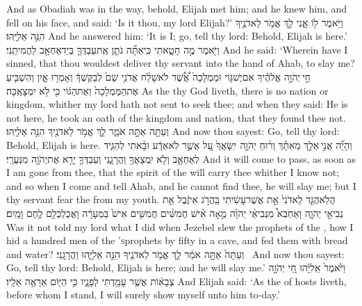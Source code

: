 {And as Obadiah was in the way, behold, Elijah met him; and he knew him, and fell on his face, and said: ‘Is it thou, my lord Elijah?’}
{וַיֹּ֥אמֶר ל֖וֹ אָ֑נִי לֵ֛ךְ אֱמֹ֥ר לַאדֹנֶ֖יךָ הִנֵּ֥ה אֵלִיָּֽהוּ׃}
{And he answered him: ‘It is I; go, tell thy lord: Behold, Elijah is here.’}
{וַיֹּ֖אמֶר מֶ֣ה חָטָ֑אתִי כִּֽי\maqqaf אַתָּ֞ה נֹתֵ֧ן אֶֽת\maqqaf עַבְדְּךָ֛ בְּיַד\maqqaf אַחְאָ֖ב לַהֲמִיתֵֽנִי׃}
{And he said: ‘Wherein have I sinned, that thou wouldest deliver thy servant into the hand of Ahab, to slay me?}
{חַ֣י \legarmeh  יְהֹוָ֣ה אֱלֹהֶ֗יךָ אִם\maqqaf יֶשׁ\maqqaf גּ֤וֹי וּמַמְלָכָה֙ אֲ֠שֶׁ֠ר לֹא\maqqaf שָׁלַ֨ח אֲדֹנִ֥י שָׁם֙ לְבַקֶּשְׁךָ֔ וְאָמְר֖וּ אָ֑יִן וְהִשְׁבִּ֤יעַ אֶת\maqqaf הַמַּמְלָכָה֙ וְאֶת\maqqaf הַגּ֔וֹי כִּ֖י לֹ֥א יִמְצָאֶֽכָּה׃}
{As the \lord\space thy God liveth, there is no nation or kingdom, whither my lord hath not sent to seek thee; and when they said: He is not here, he took an oath of the kingdom and nation, that they found thee not.}
{וְעַתָּ֖ה אַתָּ֣ה אֹמֵ֑ר לֵ֛ךְ אֱמֹ֥ר לַאדֹנֶ֖יךָ הִנֵּ֥ה אֵלִיָּֽהוּ׃}
{And now thou sayest: Go, tell thy lord: Behold, Elijah is here.}
{וְהָיָ֞ה אֲנִ֣י \legarmeh  אֵלֵ֣ךְ מֵאִתָּ֗ךְ וְר֨וּחַ יְהֹוָ֤ה \pasek  יִֽשָּׂאֲךָ֙ עַ֚ל אֲשֶׁ֣ר לֹֽא\maqqaf אֵדָ֔ע וּבָ֨אתִי לְהַגִּ֧יד לְאַחְאָ֛ב וְלֹ֥א יִֽמְצָאֲךָ֖ וַהֲרָגָ֑נִי וְעַבְדְּךָ֛ יָרֵ֥א אֶת\maqqaf יְהֹוָ֖ה מִנְּעֻרָֽי׃}
{And it will come to pass, as soon as I am gone from thee, that the spirit of the \lord\space will carry thee whither I know not; and so when I come and tell Ahab, and he cannot find thee, he will slay me; but I thy servant fear the \lord\space from my youth.}
{הֲלֹֽא\maqqaf הֻגַּ֤ד לַֽאדֹנִי֙ אֵ֣ת אֲשֶׁר\maqqaf עָשִׂ֔יתִי בַּֽהֲרֹ֣ג אִיזֶ֔בֶל אֵ֖ת נְבִיאֵ֣י יְהֹוָ֑ה וָאַחְבִּא֩ מִנְּבִיאֵ֨י יְהֹוָ֜ה מֵ֣אָה אִ֗ישׁ חֲמִשִּׁ֨ים חֲמִשִּׁ֥ים אִישׁ֙ בַּמְּעָרָ֔ה וָאֲכַלְכְּלֵ֖ם לֶ֥חֶם וָמָֽיִם׃}
{Was it not told my lord what I did when Jezebel slew the prophets of the \lord, how I hid a hundred men of the \lord\textsc{’s}\space prophets by fifty in a cave, and fed them with bread and water?}
{וְעַתָּה֙ אַתָּ֣ה אֹמֵ֔ר לֵ֛ךְ אֱמֹ֥ר לַאדֹנֶ֖יךָ הִנֵּ֣ה אֵלִיָּ֑הוּ וַהֲרָגָֽנִי׃ \setuma }
{And now thou sayest: Go, tell thy lord: Behold, Elijah is here; and he will slay me.’}
{וַיֹּ֙אמֶר֙ אֵֽלִיָּ֔הוּ חַ֚י יְהֹוָ֣ה צְבָא֔וֹת אֲשֶׁ֥ר עָמַ֖דְתִּי לְפָנָ֑יו כִּ֥י הַיּ֖וֹם אֵרָאֶ֥ה אֵלָֽיו׃}
{And Elijah said: ‘As the \lord\space of hosts liveth, before whom I stand, I will surely show myself unto him to-day.’}
